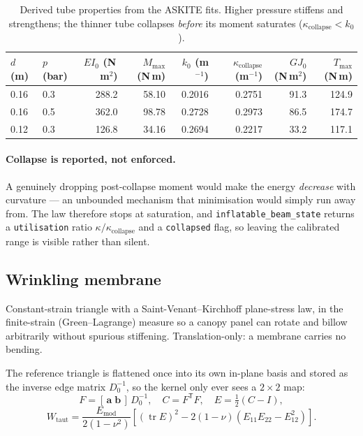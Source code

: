\documentclass[11pt,a4paper]{article}
\newcommand{\code}[1]{\texttt{\small #1}}
\begin{document}
\begin{table}[H]
\centering
\caption{Derived tube properties from the ASKITE fits.
Higher pressure stiffens and strengthens; the thinner tube collapses
\emph{before} its moment saturates ($\kappa_{\text{collapse}} < k_0$).}
\label{tab:tube}
\begin{tabular}{llrrrrrr}
\toprule
$d$ (m) & $p$ (bar) & $EI_0$ (N\,m$^2$) & $M_{\max}$ (N\,m) & $k_0$ (m$^{-1}$)
 & $\kappa_{\text{collapse}}$ (m$^{-1}$) & $GJ_0$ (N\,m$^2$) & $T_{\max}$ (N\,m)\\
\midrule
0.16 & 0.3 & 288.2 & 58.10 & 0.2016 & 0.2751 & 91.3 & 124.9 \\
0.16 & 0.5 & 362.0 & 98.78 & 0.2728 & 0.2973 & 86.5 & 174.7 \\
0.12 & 0.3 & 126.8 & 34.16 & 0.2694 & 0.2217 & 33.2 & 117.1 \\
\bottomrule
\end{tabular}
\end{table}

\paragraph{Collapse is reported, not enforced.}
A genuinely dropping post-collapse moment would make the energy \emph{decrease}
with curvature --- an unbounded mechanism that minimisation would simply run
away from. The law therefore stops at saturation, and
\code{inflatable\_beam\_state} returns a \code{utilisation} ratio
$\kappa/\kappa_{\text{collapse}}$ and a \code{collapsed} flag, so leaving the
calibrated range is visible rather than silent.

\subsection{Wrinkling membrane}
\label{sec:membrane}

Constant-strain triangle with a Saint-Venant--Kirchhoff plane-stress law, in the
finite-strain (Green--Lagrange) measure so a canopy panel can rotate and billow
arbitrarily without spurious stiffening. Translation-only: a membrane carries no
bending.

The reference triangle is flattened once into its own in-plane basis and stored
as the inverse edge matrix $D_0^{-1}$, so the kernel only ever sees a $2\times2$
map:
\begin{equation}
  F = [\,\mathbf{a}\;\mathbf{b}\,]\,D_0^{-1}, \quad
  C = F^{\mathsf T}F, \quad
  E = \tfrac{1}{2}(C-I),
\end{equation}
\begin{equation}
  W_{\text{taut}} = \frac{E_{\text{mod}}}{2(1-\nu^2)}
   \left[(\operatorname{tr}E)^2 - 2(1-\nu)\left(E_{11}E_{22}-E_{12}^2\right)\right].
\end{equation}
\end{document}
